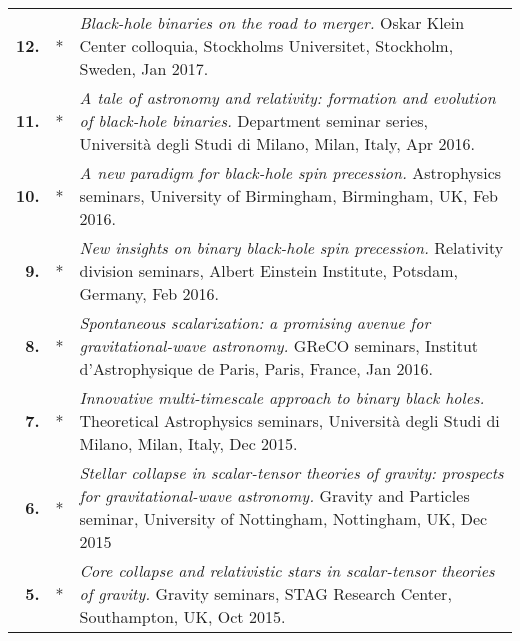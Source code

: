 \documentclass[11pt,letterpaper,sans]{moderncv}   %
\begin{document}
{\begin{longtable}{rp{0.4cm}p{15.8cm}}
%
\textbf{12.} & *& \textit{Black-hole binaries on the road to merger.}
\newline{} 
Oskar Klein Center colloquia, Stockholms Universitet, Stockholm, Sweden, Jan 2017.
\vspace{0.05cm}\\
%
\textbf{11.} & *& \textit{A tale of astronomy and relativity: formation and evolution of black-hole binaries.}
\newline{} 
Department seminar series, Università degli Studi di Milano, Milan, Italy, Apr 2016.
\vspace{0.05cm}\\
%
\textbf{10.} & *& \textit{A new paradigm for black-hole spin precession.}
\newline{} 
Astrophysics seminars, University of Birmingham, Birmingham, UK, Feb 2016.
\vspace{0.05cm}\\
%
\textbf{9.} & *& \textit{New insights on binary black-hole spin precession.}
\newline{} 
Relativity division seminars, Albert Einstein Institute, Potsdam, Germany, Feb 2016.
\vspace{0.05cm}\\
%
\textbf{8.} & *& \textit{Spontaneous scalarization: a promising avenue for gravitational-wave astronomy.}
\newline{} 
GReCO seminars, Institut d'Astrophysique de Paris, Paris, France, Jan 2016.
\vspace{0.05cm}\\
%
\textbf{7.} & *& \textit{Innovative multi-timescale approach to binary black holes.}
\newline{} 
Theoretical Astrophysics seminars, Università degli Studi di Milano, Milan, Italy, Dec 2015.
\vspace{0.05cm}\\
%
\textbf{6.} & *& \textit{Stellar collapse in scalar-tensor theories of gravity: prospects for gravitational-wave astronomy.}
\newline{} 
Gravity and Particles seminar, University of Nottingham, Nottingham, UK, Dec 2015
\vspace{0.05cm}\\
%
\textbf{5.} & *& \textit{Core collapse and relativistic stars in scalar-tensor theories of gravity.}
\newline{} 
Gravity seminars, STAG Research Center, Southampton, UK, Oct 2015.
\vspace{0.05cm}\\

\end{longtable}}
\end{document}
